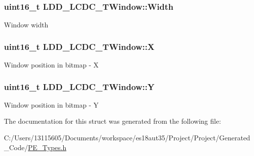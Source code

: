 \subsubsection[{Width}]{\setlength{\rightskip}{0pt plus 5cm}uint16\+\_\+t L\+D\+D\+\_\+\+L\+C\+D\+C\+\_\+\+T\+Window\+::\+Width}\label{struct_l_d_d___l_c_d_c___t_window_a53ee53813f5884a400be8ca3093233c4}
Window width \hypertarget{struct_l_d_d___l_c_d_c___t_window_a9dd1270e9794b4dbd79b2b30afca87c9}{}
\subsubsection[{X}]{\setlength{\rightskip}{0pt plus 5cm}uint16\+\_\+t L\+D\+D\+\_\+\+L\+C\+D\+C\+\_\+\+T\+Window\+::\+X}\label{struct_l_d_d___l_c_d_c___t_window_a9dd1270e9794b4dbd79b2b30afca87c9}
Window position in bitmap -\/ X \hypertarget{struct_l_d_d___l_c_d_c___t_window_af64f532d1fb5899c563ba40df90867d8}{}
\subsubsection[{Y}]{\setlength{\rightskip}{0pt plus 5cm}uint16\+\_\+t L\+D\+D\+\_\+\+L\+C\+D\+C\+\_\+\+T\+Window\+::\+Y}\label{struct_l_d_d___l_c_d_c___t_window_af64f532d1fb5899c563ba40df90867d8}
Window position in bitmap -\/ Y 

The documentation for this struct was generated from the following file\+:\begin{DoxyCompactItemize}
\item 
C\+:/\+Users/13115605/\+Documents/workspace/es18aut35/\+Project/\+Project/\+Generated\+\_\+\+Code/\hyperlink{_p_e___types_8h}{P\+E\+\_\+\+Types.\+h}\end{DoxyCompactItemize}

